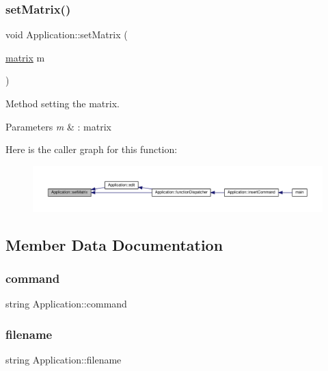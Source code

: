 \subsubsection{\texorpdfstring{set\+Matrix()}{setMatrix()}}
{\footnotesize\ttfamily void Application\+::set\+Matrix (\begin{DoxyParamCaption}\item[{\hyperlink{formula_8h_a869e2a5deeb3daa4c82d6bc91cf20d92}{matrix}}]{m }\end{DoxyParamCaption})}

Method setting the matrix. 
\begin{DoxyParams}{Parameters}
{\em m} & \+: matrix \\
\hline
\end{DoxyParams}
Here is the caller graph for this function\+:\nopagebreak
\begin{figure}[H]
\begin{center}
\leavevmode
\includegraphics[width=350pt]{class_application_a56b4a55e9eabd40b7f0033ba39631ebe_icgraph}
\end{center}
\end{figure}


\subsection{Member Data Documentation}
\mbox{\label{class_application_acffe56e592fb525ce14ad0437c2c3d34}} 
\subsubsection{\texorpdfstring{command}{command}}
{\footnotesize\ttfamily string Application\+::command\hspace{0.3cm}{\ttfamily [private]}}

\mbox{\label{class_application_a3a20c3178562a91be951369d3356aabd}} 
\subsubsection{\texorpdfstring{filename}{filename}}
{\footnotesize\ttfamily string Application\+::filename\hspace{0.3cm}{\ttfamily [private]}}


